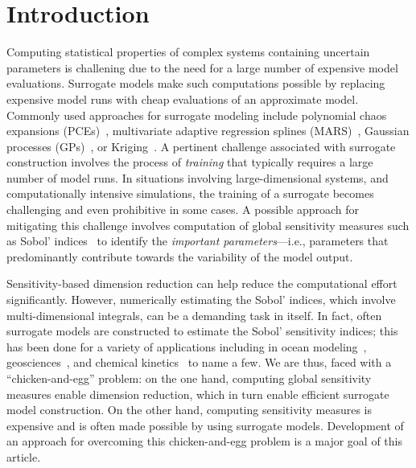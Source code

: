 \section{Introduction}
\label{sec:intro}

Computing statistical properties of 
complex systems containing uncertain parameters is
challening due to the need for a large number of expensive model evaluations. 
Surrogate models make such computations possible by replacing 
expensive model runs with cheap evaluations of an approximate model.
%
%
Commonly used approaches for surrogate modeling include polynomial chaos
expansions (PCEs)~\cite{Xiu:2002,Ghanem:2003,Olivier:2010}, multivariate
adaptive regression splines (MARS)~\cite{friedman93}, Gaussian processes
(GPs)~\cite{Rasmussen:2004}, or Kriging~\cite{Stein:2012}. A pertinent
challenge associated with surrogate construction involves the process of
\textit{training} that typically requires a large number of model runs.  In
situations involving large-dimensional systems, and computationally intensive
simulations, the training of a surrogate becomes challenging and
even prohibitive in some cases. A possible approach for mitigating this
challenge involves computation of global sensitivity measures such as Sobol'
indices~\cite{Sobol93,Sobol:2001,Owen13,SaltelliRattoAndresEtAl08} to identify
the \emph{important parameters}---i.e., parameters that predominantly
contribute towards the variability of the model output. 

Sensitivity-based
dimension reduction can help reduce the computational effort
significantly. However, numerically estimating the Sobol' indices, which
involve multi-dimensional integrals, can be a demanding task in itself. In
fact, often surrogate models are constructed to estimate the Sobol' sensitivity
indices; this has been done for a variety of applications including in ocean
modeling~\cite{AlexanderianWinokurSrajEtAl12,LiIskandaraniLeHenaffEtAl16},
geosciences~\cite{Namhata2016OladyshkinDilmoreEtAl16,deman2016,SaadAlexanderianPrudhommeEtAl17},
and chemical kinetics~\cite{DegasperiGilmore08,navarro2016global,Vohra:2014} to
name a few. 
We are thus, faced with a ``chicken-and-egg'' problem: on the one hand,
computing global sensitivity measures enable dimension reduction, which in turn
enable efficient surrogate model construction.  On the other hand, computing
sensitivity measures is expensive and is often made possible by using
surrogate models. Development of an approach for 
overcoming this chicken-and-egg problem is a major goal of this article. 


